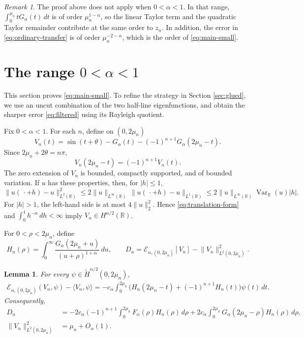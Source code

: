 \documentclass[11pt]{amsart}
\numberwithin{equation}{section}
\newtheorem{lemma}[lemma]{Lemma}
\theoremstyle{remark}
\newtheorem{remark}[remark]{Remark}
\newcommand{\R}{\mathbb R}
\newcommand{\wt}{\widetilde}
\newcommand{\norm}[2][]{\lVert #2\rVert_{#1}}
\newcommand{\ip}[2]{\langle #1,#2\rangle}
\newcommand{\Var}{\operatorname{Var}}
\newcommand{\calE}{\mathcal E}
\begin{document}
\begin{remark}
The proof above does not apply when $0<\alpha<1$.  In that range,
$\int_0^{\mu_n}tG_\alpha(t)\,dt$ is of order $\mu_n^{1-\alpha}$, so the linear
Taylor term and the quadratic Taylor remainder contribute at the same order
to $z_n$.  In addition, the error in \eqref{eq:ordinary-transfer} is of order
$\mu_n^{-2-\alpha}$, which is the order of 
\eqref{eq:main-small}.
\end{remark}

\section{The range \texorpdfstring{$0<\alpha<1$}{0 < alpha < 1}}
\label{sec:small}

This section proves \eqref{eq:main-small}. To refine the strategy in Section \ref{sec:glued}, we use an uncut combination of
the two half-line eigenfunctions, and obtain the sharper error \eqref{eq:filtered} using its Rayleigh quotient.

Fix $0<\alpha<1$.  For each $n$, define on $(0,2\mu_n)$
\begin{equation}\label{eq:V}
 V_n(t)=\sin(t+\theta)-G_\alpha(t)
 -(-1)^{n+1}G_\alpha(2\mu_n-t).
\end{equation}
Since $2\mu_n+2\theta=n\pi$,
\begin{equation}\label{eq:V-reflection}
 V_n(2\mu_n-t)=(-1)^{n+1}V_n(t).
\end{equation}
The zero extension of $V_n$ is bounded, compactly supported, and of bounded
variation.  If $u$ has these properties, then, for $|h|\le1$,
\[
 \norm[L^2(\R)]{u(\,\cdot+h)-u}^2
 \le2\norm[L^\infty(\R)]{u}\,
      \norm[L^1(\R)]{u(\,\cdot+h)-u}
 \le2\norm[L^\infty(\R)]{u}\Var_\R(u)|h|.
\]
For $|h|>1$, the left-hand side is at most $4\|u\|_2^2$.  Hence
\eqref{eq:translation-form} and $\int_0^1h^{-\alpha}\,dh<\infty$ imply
$V_n\in H^{\alpha/2}(\R)$.

For $0<\rho<2\mu_n$, define
\[
 H_n(\rho)=\int_0^\infty
 \frac{G_\alpha(2\mu_n+u)}{(u+\rho)^{1+\alpha}}\,du,
 \qquad
 D_n=\calE_{\alpha,(0,2\mu_n)}[V_n]
     -\norm[L^2(0,2\mu_n)]{V_n}^2.
\]

\begin{lemma}\label{lem:exact-form-identity}
For every $\psi\in\wt H^{\alpha/2}(0,2\mu_n)$,
\begin{equation}\label{formid}
 \begin{aligned}
 \calE_{\alpha,(0,2\mu_n)}(V_n,\psi)-\ip{V_n}{\psi}=-c_\alpha\int_0^{2\mu_n}
 \bigl(H_n(2\mu_n-t)+(-1)^{n+1}H_n(t)\bigr)\psi(t)\,dt.
 \end{aligned}
\end{equation}
Consequently,
\begin{equation}\label{eq:Dexact}
\begin{aligned}
 D_n&=-2c_\alpha(-1)^{n+1}\int_0^{2\mu_n}
 F_\alpha(\rho)H_n(\rho)\,d\rho+2c_\alpha\int_0^{2\mu_n}
 G_\alpha(2\mu_n-\rho)H_n(\rho)\,d\rho,\\
 \norm[L^2(0,2\mu_n)]{V_n}^2&=\mu_n+O_\alpha(1).
\end{aligned}
\end{equation}
\end{lemma}
\end{document}
